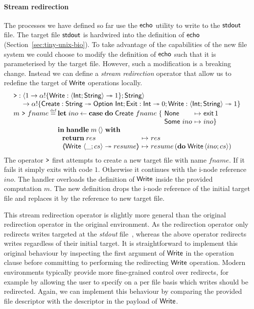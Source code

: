 \documentclass[12pt,phd,lfcs,twoside,openright,logo,leftchapter,normalheadings]{infthesis}
\theoremstyle{plain}
\theoremstyle{definition}
\begin{document}
\paragraph{Stream redirection}
%
The processes we have defined so far use the $\mathsf{echo}$ utility to write
to the $\mathsf{stdout}$ file. The target file $\mathsf{stdout}$ is hardwired into the
definition of $\mathsf{echo}$ (Section~\ref{sec:tiny-unix-bio}). To take
advantage of the capabilities of the new file system we could choose
to modify the definition of $\mathsf{echo}$ such that it is parameterised by
the target file. However, such a modification is a breaking
change. Instead we can define a \emph{stream redirection} operator
that allow us to redefine the target of $\mathsf{Write}$ operations locally.
%
\[
  \bl
  \redirect :
     \bl
       \Record{\UnitType \to \alpha \eff \{\Write : \Record{\Int;\String} \opto \UnitType\}; \String}\\
       \to \alpha \eff \{\UCreate : \String \opto \Option~\Int;\Exit : \Int \opto \ZeroType;\Write : \Record{\Int;\String} \opto \UnitType\}
     \el\\
    m~\redirect~fname \defas
        \ba[t]{@{}l}
        \Let\;ino \revto \Case\;\Do\;\UCreate~fname\;\{
          \ba[t]{@{~}l@{~}c@{~}l}
            \None &\mapsto& \exit\,1\\
            \Some~ino &\mapsto& ino\}
          \ea\\
          \In\;\Handle\;m\,\Unit\;\With\\
             ~\ba{@{~}l@{~}c@{~}l}
                 \Return\;res      &\mapsto& res\\
                 \OpCase{\Write}{\Record{\_;cs}}{resume} &\mapsto& resume\,(\Do\;\Write\,\Record{ino;cs})
               \ea
         \ea
  \el
\]
%
The operator $\texttt{>}$ first attempts to create a new target file
with name $fname$. If it fails it simply exits with code
$1$. Otherwise it continues with the i-node reference $ino$. The
handler overloads the definition of $\mathsf{Write}$ inside the provided
computation $m$. The new definition drops the i-node reference of the
initial target file and replaces it by the reference to new target
file.

This stream redirection operator is slightly more general than the
original redirection operator in the original \UNIX{} environment. As
the \UNIX{} redirection operator only redirects writes targeted at the
\emph{stdout} file~\cite{RitchieT74}, whereas the above operator
redirects writes regardless of their initial target.
%
It is straightforward to implement this original \UNIX{} behaviour by
inspecting the first argument of $\mathsf{Write}$ in the operation clause
before committing to performing the redirecting $\mathsf{Write}$ operation.
%
Modern \UNIX{} environments typically provide more fine-grained
control over redirects, for example by allowing the user to specify on
a per file basis which writes should be redirected. Again, we can
implement this behaviour by comparing the provided file descriptor
with the descriptor in the payload of $\mathsf{Write}$.
\end{document}
